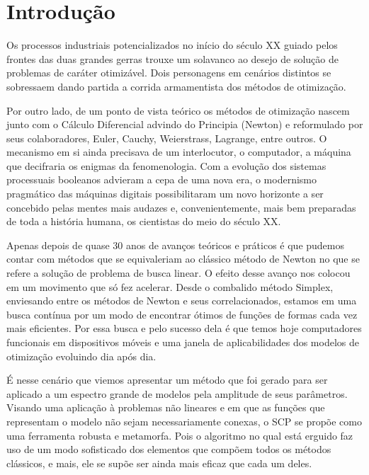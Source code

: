 
\chapter{Introdução}
\label{chap:introducao}

\noindent
Os processos industriais potencializados no início do século XX guiado pelos frontes das duas grandes gerras trouxe um solavanco ao desejo de solução de problemas de caráter otimizável. Dois personagens em cenários distintos se sobressaem dando partida a corrida armamentista dos métodos de otimização.

Por outro lado, de um ponto de vista teórico os métodos de otimização nascem junto com o Cálculo Diferencial advindo do Principia (Newton) e reformulado por seus colaboradores, Euler, Cauchy, Weierstrass, Lagrange, entre outros. O mecanismo em si ainda precisava de um interlocutor, o computador, a máquina que decifraria os enigmas da fenomenologia. Com a evolução dos sistemas processuais booleanos advieram a cepa de uma nova era, o modernismo pragmático das máquinas digitais possibilitaram um novo horizonte a ser concebido pelas mentes mais audazes e, convenientemente, mais bem preparadas de toda a história humana, os cientistas do meio do século XX. 

Apenas depois de quase 30 anos de avanços teóricos e práticos é que pudemos contar com métodos que se equivaleriam ao clássico método de Newton no que se refere a solução de problema de busca linear. O efeito desse avanço nos colocou em um movimento que só fez acelerar. Desde o combalido método Simplex, enviesando entre os métodos de Newton e seus correlacionados, estamos em uma busca contínua por um modo de encontrar ótimos de funções de formas cada vez mais eficientes. Por essa busca e pelo sucesso dela é que temos hoje computadores funcionais em dispositivos móveis e uma janela de aplicabilidades dos modelos de otimização evoluindo dia após dia. 

É nesse cenário que viemos apresentar um método que foi gerado para ser aplicado a um espectro grande de modelos pela amplitude de seus parâmetros. Visando uma aplicação à problemas não lineares e em que as funções que representam o modelo não sejam necessariamente conexas, o SCP se propõe como uma ferramenta robusta e metamorfa. Pois o algoritmo no qual está erguido faz uso de um modo sofisticado dos elementos que compõem todos os métodos clássicos, e mais, ele se supõe ser ainda mais eficaz que cada um deles.

